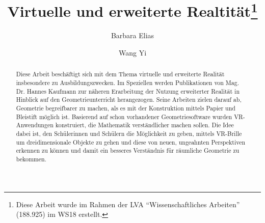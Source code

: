 \documentclass[deutsch]{llncs}
\begin{document}
\def\abstractname{Kurzfassung.}

\pagestyle{plain}

\title{Virtuelle und erweiterte Realtität\thanks{Diese Arbeit wurde im Rahmen der LVA ``Wissenschaftliches Arbeiten'' (188.925) im WS18 erstellt.}}




\author{Barbara Elias \and Wang Yi}


\maketitle

\setcounter{footnote}{0}

\begin{abstract}
Diese Arbeit beschäftigt sich mit dem Thema virtuelle und erweiterte Realität insbesondere zu Ausbildungszwecken. Im Speziellen werden Publikationen von Mag. Dr. Hannes Kaufmann zur näheren Erarbeitung der Nutzung erweiterter Realität in Hinblick auf den Geometrieunterricht herangezogen. Seine Arbeiten zielen darauf ab, Geometrie begreifbarer zu machen, als es mit der Konstruktion mittels Papier und Bleistift möglich ist. Basierend auf schon vorhandener Geometriesoftware wurden VR-Anwendungen konstruiert, die Mathematik verständlicher machen sollen. Die Idee dabei ist, den Schülerinnen und Schülern die Möglichkeit zu geben, mittels VR-Brille um dreidimensionale Objekte zu gehen und diese von neuen, ungeahnten Perspektiven erkennen zu können und damit ein besseres Verständnis für räumliche Geometrie zu bekommen. 
\end{abstract}
\end{document}
